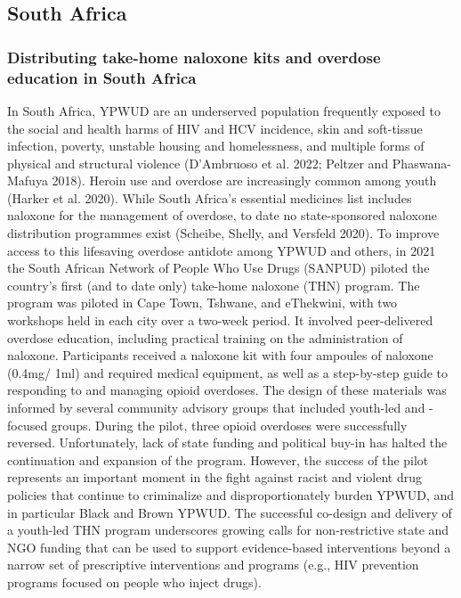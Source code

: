\documentclass[
  letterpaper,
  DIV=11,
  numbers=noendperiod]{scrartcl}
\begin{document}
\subsection{South Africa}

\subsubsection{Distributing take-home naloxone kits and overdose
education in South
Africa}\label{distributing-take-home-naloxone-kits-and-overdose-education-in-south-africa}

In South Africa, YPWUD are an underserved population frequently exposed
to the social and health harms of HIV and HCV incidence, skin and
soft-tissue infection, poverty, unstable housing and homelessness, and
multiple forms of physical and structural violence (D'Ambruoso et al.
2022; Peltzer and Phaswana-Mafuya 2018). Heroin use and overdose are
increasingly common among youth (Harker et al. 2020). While South
Africa's essential medicines list includes naloxone for the management
of overdose, to date no state-sponsored naloxone distribution programmes
exist (Scheibe, Shelly, and Versfeld 2020). To improve access to this
lifesaving overdose antidote among YPWUD and others, in 2021 the South
African Network of People Who Use Drugs (SANPUD) piloted the country's
first (and to date only) take-home naloxone (THN) program. The program
was piloted in Cape Town, Tshwane, and eThekwini, with two workshops
held in each city over a two-week period. It involved peer-delivered
overdose education, including practical training on the administration
of naloxone. Participants received a naloxone kit with four ampoules of
naloxone (0.4mg/ 1ml) and required medical equipment, as well as a
step-by-step guide to responding to and managing opioid overdoses. The
design of these materials was informed by several community advisory
groups that included youth-led and -focused groups. During the pilot,
three opioid overdoses were successfully reversed. Unfortunately, lack
of state funding and political buy-in has halted the continuation and
expansion of the program. However, the success of the pilot represents
an important moment in the fight against racist and violent drug
policies that continue to criminalize and disproportionately burden
YPWUD, and in particular Black and Brown YPWUD. The successful co-design
and delivery of a youth-led THN program underscores growing calls for
non-restrictive state and NGO funding that can be used to support
evidence-based interventions beyond a narrow set of prescriptive
interventions and programs (e.g., HIV prevention programs focused on
people who inject drugs).
\end{document}
